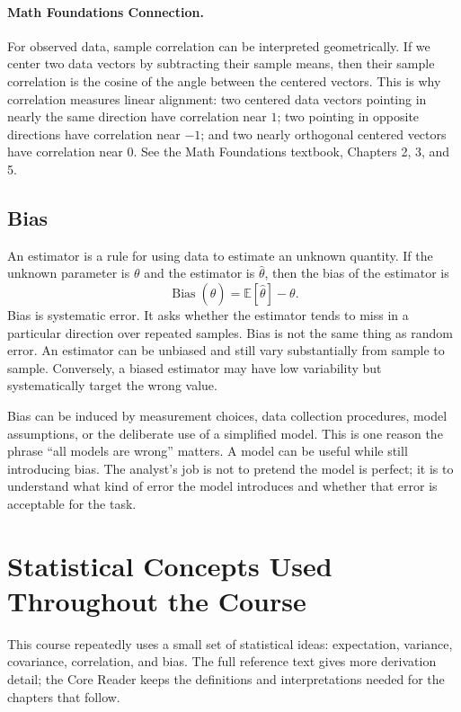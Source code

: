 {\paragraph{Math Foundations Connection.}
For observed data, sample correlation can be interpreted geometrically.  If we center two data vectors by subtracting their sample means, then their sample correlation is the cosine of the angle between the centered vectors.  This is why correlation measures linear alignment: two centered data vectors pointing in nearly the same direction have correlation near $1$; two pointing in opposite directions have correlation near $-1$; and two nearly orthogonal centered vectors have correlation near $0$.  See the Math Foundations textbook, Chapters 2, 3, and 5.

\subsection{Bias}

An estimator is a rule for using data to estimate an unknown quantity.  If the unknown parameter is $\theta$ and the estimator is $\hat{\theta}$, then the bias of the estimator is
\begin{equation}
  \operatorname{Bias}(\hat{\theta})
  = \mathbb{E}[\hat{\theta}] - \theta.
  \label{eq:bias-definition}
\end{equation}
Bias is systematic error.  It asks whether the estimator tends to miss in a particular direction over repeated samples.  Bias is not the same thing as random error.  An estimator can be unbiased and still vary substantially from sample to sample.  Conversely, a biased estimator may have low variability but systematically target the wrong value.

Bias can be induced by measurement choices, data collection procedures, model assumptions, or the deliberate use of a simplified model.  This is one reason the phrase ``all models are wrong'' matters.  A model can be useful while still introducing bias.  The analyst's job is not to pretend the model is perfect; it is to understand what kind of error the model introduces and whether that error is acceptable for the task.
}{
\section{Statistical Concepts Used Throughout the Course}

This course repeatedly uses a small set of statistical ideas: expectation, variance, covariance, correlation, and bias.  The full reference text gives more derivation detail; the Core Reader keeps the definitions and interpretations needed for the chapters that follow.

}
